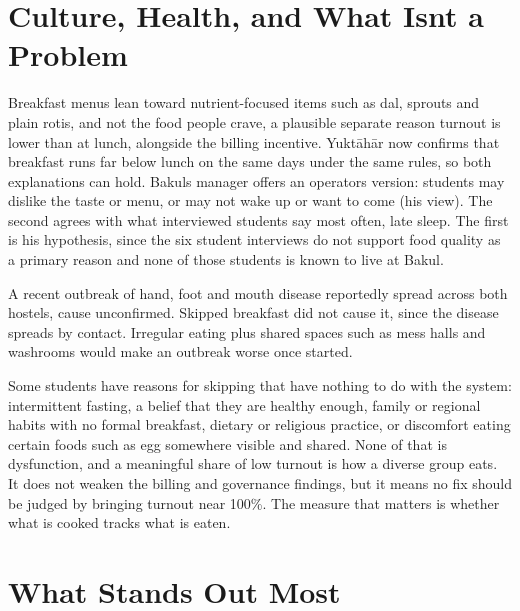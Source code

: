 \documentclass[
  10pt,
  table]{article}
\newcounter{none} %
\begin{document}
\section{Culture, Health, and What Isn\textquotesingle t a Problem}\label{culture-health-and-what-isnt-a-problem}

Breakfast menus lean toward nutrient-focused items such as dal, sprouts and plain rotis, and not the food people crave, a plausible separate reason turnout is lower than at lunch, alongside the billing incentive. Yuktāhār now confirms that breakfast runs far below lunch on the same days under the same rules, so both explanations can hold. Bakul\textquotesingle s manager offers an operator\textquotesingle s version: students may dislike the taste or menu, or may not wake up or want to come (his view). The second agrees with what interviewed students say most often, late sleep. The first is his hypothesis, since the six student interviews do not support food quality as a primary reason and none of those students is known to live at Bakul.

A recent outbreak of hand, foot and mouth disease reportedly spread across both hostels, cause unconfirmed. Skipped breakfast did not cause it, since the disease spreads by contact. Irregular eating plus shared spaces such as mess halls and washrooms would make an outbreak worse once started.

Some students have reasons for skipping that have nothing to do with the system: intermittent fasting, a belief that they are healthy enough, family or regional habits with no formal breakfast, dietary or religious practice, or discomfort eating certain foods such as egg somewhere visible and shared. None of that is dysfunction, and a meaningful share of low turnout is how a diverse group eats. It does not weaken the billing and governance findings, but it means no fix should be judged by bringing turnout near 100\%. The measure that matters is whether what is cooked tracks what is eaten.

\section{What Stands Out Most}\label{what-stands-out-most}
\end{document}
